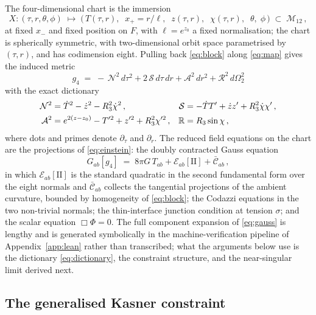 \documentclass[11pt]{article}
\numberwithin{equation}{section}
\theoremstyle{plain}
\theoremstyle{definition}
\theoremstyle{remark}
\newcommand{\M}{\mathcal{M}}
\newcommand{\II}{\mathrm{II}}
\newcommand{\N}{\mathcal{N}}
\newcommand{\A}{\mathcal{A}}
\newcommand{\Rr}{\mathcal{R}}
\newcommand{\Geff}{G}
\begin{document}
The four-dimensional chart is the immersion
\begin{equation}\label{eq:map}
X : (\tau, r, \theta, \phi) \;\longmapsto\;
\bigl(\, T(\tau, r),\;\; x_{+} = r/\ell,\;\; z(\tau, r),\;\;
\chi(\tau, r),\;\; \theta,\; \phi \,\bigr) \;\subset\; \M_{12}\,,
\end{equation}
at fixed $x_{-}$ and fixed position on $F$, with $\ell = e^{z_{0}}$ a
fixed normalisation; the chart is spherically symmetric, with
two-dimensional orbit space parametrised by $(\tau, r)$, and has
codimension eight. Pulling back \eqref{eq:block} along \eqref{eq:map}
gives the induced metric
\begin{equation}\label{eq:induced}
g_{4} \;=\; -\,\N^{2}\,d\tau^{2} + 2\,\mathcal{S}\,d\tau\,dr
+ \A^{2}\,dr^{2} + \Rr^{2}\,d\Omega_{2}^{2}
\end{equation}
with the exact dictionary
\begin{equation}\label{eq:dictionary}
\begin{aligned}
\N^{2} &= \dot T^{2} - \dot z^{2} - R_{3}^{2}\dot\chi^{2}\,, &
\mathcal{S} &= -\dot T T' + \dot z z' + R_{3}^{2}\dot\chi\chi'\,,\\
\A^{2} &= e^{2(z - z_{0})} - T'^{2} + z'^{2} + R_{3}^{2}\chi'^{2}\,, &
\R &= R_{3}\sin\chi\,,
\end{aligned}
\end{equation}
where dots and primes denote $\partial_{\tau}$ and $\partial_{r}$.
The reduced field equations on the chart are the projections of
\eqref{eq:einstein}: the doubly contracted Gauss equation
\begin{equation}\label{eq:gauss}
G_{ab}[g_{4}] \;=\; 8\pi\Geff\, T_{ab}
+ \mathcal{E}_{ab}[\II] + \bar{\mathcal{C}}_{ab}\,,
\end{equation}
in which $\mathcal{E}_{ab}[\II]$ is the standard quadratic in the
second fundamental form over the eight normals and
$\bar{\mathcal{C}}_{ab}$ collects the tangential projections of the
ambient curvature, bounded by homogeneity of \eqref{eq:block}; the
Codazzi equations in the two non-trivial normals; the thin-interface
junction condition at tension $\sigma$; and the scalar equation
$\Box\Phi = 0$. The full component expansion of \eqref{eq:gauss} is
lengthy and is generated symbolically in the machine-verification
pipeline of Appendix~\ref{app:lean} rather than transcribed; what the
arguments below use is the dictionary \eqref{eq:dictionary}, the
constraint structure, and the near-singular limit derived next.

\subsection{The generalised Kasner constraint}\label{sec:budget}
\end{document}
